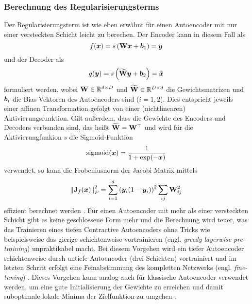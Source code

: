 \subsubsection{Berechnung des Regularisierungsterms}
\label{ch:MethodenDerDimRed:ML:CAE:BerechnungRegTerm}
Der Regularisierungsterm ist wie eben erwähnt für einen Autoencoder mit nur einer versteckten Schicht leicht zu berechen. Der Encoder
kann in diesem Fall als
\begin{equation}
	f(\bm{x}) = s \left( \mathbf{W} \bm{x} + \bm{b}_1 \right) = \bm{y}
\end{equation}
und der Decoder als
\begin{equation}
	g(\bm{y}) = s \left( \mathbf{\widetilde{W}} \bm{y} + \bm{b}_2 \right) = \hat{\bm{x}}
\end{equation}
formuliert werden, wobei $\mathbf{W} \in \mathbb{R}^{d \times D}$ und $\mathbf{\widetilde{W}} \in \mathbb{R}^{D \times d}$ die Gewichtsmatrizen und $\bm{b}_i$ die Bias-Vektoren des Autoencoders sind ($i = 1, 2$). Dies entspricht jeweils einer affinen Transformation gefolgt von einer (nichtlinearen) Aktivierungsfunktion. Gilt außerdem, dass die Gewichte des Encoders und Decoders verbunden sind, das heißt $\mathbf{\widetilde{W}} = \mathbf{W}^\top$ und wird für die Aktivierungfunkion $s$ die Sigmoid-Funktion
\begin{equation}
	\operatorname{sigmoid}(\bm{x}) = \frac{1}{1 + \exp (-\bm{x})}
\end{equation}
verwendet, so kann die Frobeniusnorm der Jacobi-Matrix mittels
\begin{equation}
	\left\lVert\mathbf{J}_f(\bm{x})\right\rVert_F^2 = \sum_{i = 1}^d \left( \bm{y}_i (1 - \bm{y}_i)\right)^2 \sum_{ij} \mathbf{W}^2_{ij}
\end{equation}
effizient berechnet werden \parencite[4]{Rifai.2011}. Für einen Autoencoder mit mehr als einer versteckten Schicht gibt es keine
geschlossene Form mehr und die Berechnung wird teuer, was das Trainieren eines tiefen Contractive
Autoencoders ohne Tricks wie beispielsweise das gierige schichtenweise vortrainieren (engl.
\textit{greedy layerwise pre-training}) unpraktikabel macht. Bei diesem Vorgehen wird ein tiefer
Autoencoder schichtenweise durch untiefe Autoencoder (drei Schichten) vortrainiert und im letzten
Schritt erfolgt eine Feinabstimmung des kompletten Netzwerks (engl. \textit{fine-tuning}) \parencite[522]{Goodfellow.2016}. Dieses Vorgehen kann analog auch für klassische Autoencoder verwendet
werden, um eine gute Initialisierung der Gewichte zu erreichen und damit suboptimale lokale Minima
der Zielfunktion zu umgehen \parencite[509]{Goodfellow.2016}.
